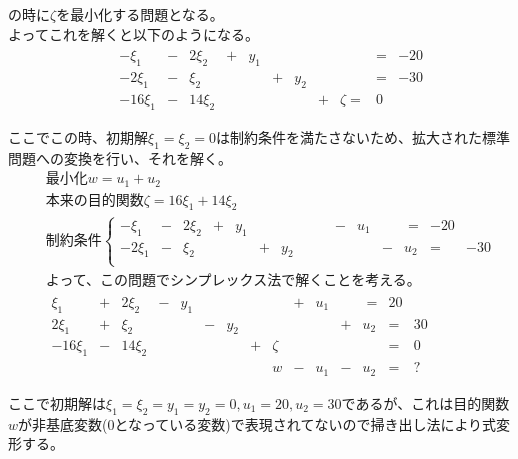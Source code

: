 \documentclass[dvipdfmx,titlepage, a4paper]{jsarticle}%
\begin{document}
の時に$\zeta$を最小化する問題となる。\\
よってこれを解くと以下のようになる。
\begin{eqnarray*}
	&&\begin{array}{cccccccccccc}
		-\xi_{1} & - & 2\xi_{2} & + & y_{1} & \; & \; & \; & \; & = & -20\\ 
		-2\xi_{1} & - & \xi_{2} & \; & \; & + & y_{2} & \; & \; & = & -30\\ 
		-16\xi_{1} & - & 14\xi_{2} & \; & \; & \; & \; & + & \zeta = & 0\\ 
	\end{array}\\
\end{eqnarray*}
ここでこの時、初期解$\xi_{1} = \xi_{2} = 0$は制約条件を満たさないため、拡大された標準問題への変換を行い、それを解く。\\
\begin{eqnarray*}
	&&\mbox{最小化}w = u_{1} + u_{2}\\
	&&\mbox{本来の目的関数}\zeta = 16\xi_{1} + 14\xi_{2}\\
	&&\mbox{制約条件}\left\{
		\begin{array}{cccccccccccccccc}
			-\xi_{1} & - & 2\xi_{2} & + & y_{1} & \; & \; & \; & \; & - & u_{1} & \; & \; = & -20\\ 
			-2\xi_{1} & - & \xi_{2} & \; & \; & + & y_{2} & \; & \; & \; & \; & - & u_{2} & = & -30\\ 
		\end{array}
		\right.\\
	&&\mbox{よって、この問題でシンプレックス法で解くことを考える。}\\
	&&\begin{array}{cccccccccccccccc}
			\xi_{1} & + & 2\xi_{2} & - & y_{1} & \; & \; & \; & \; & + & u_{1} & \; & \; = & 20\\ 
			2\xi_{1} & + & \xi_{2} & \; & \; & - & y_{2} & \; & \; & \; & \; & + & u_{2} & = & 30\\ 
			-16\xi_{1} & - & 14\xi_{2} & \; & \; & \; & \; & + & \zeta & \; & \; & \; & \; & = & 0\\ 
			\; & \; & \; & \; & \; & \; & \; & \; & w & - & u_{1} & - & u_{2} & = & ?\\ 
		\end{array}\\
\end{eqnarray*}
ここで初期解は$\xi_{1} = \xi_{2} = y_{1} = y_{2} = 0, u_{1} = 20, u_{2} = 30$であるが、これは目的関数$w$が非基底変数(0となっている変数)で表現されてないので掃き出し法により式変形する。
\end{document}
